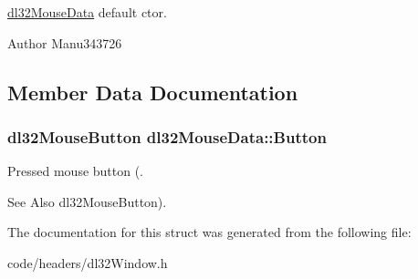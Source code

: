 \hyperlink{structdl32_mouse_data}{dl32\-Mouse\-Data} default ctor. 

\begin{DoxyAuthor}{Author}
Manu343726 
\end{DoxyAuthor}


\subsection{Member Data Documentation}
\hypertarget{structdl32_mouse_data_a58c299b3c00f707d5de338b942e7be21}{
\subsubsection[{Button}]{\setlength{\rightskip}{0pt plus 5cm}dl32\-Mouse\-Button dl32\-Mouse\-Data\-::\-Button}}\label{structdl32_mouse_data_a58c299b3c00f707d5de338b942e7be21}


Pressed mouse button (. 

\begin{DoxySeeAlso}{See Also}
dl32\-Mouse\-Button). 
\end{DoxySeeAlso}


The documentation for this struct was generated from the following file\-:\begin{DoxyCompactItemize}
\item 
code/headers/dl32\-Window.\-h\end{DoxyCompactItemize}
